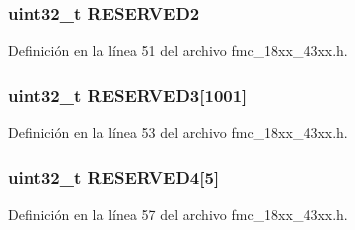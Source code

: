 \subsubsection[{\texorpdfstring{R\+E\+S\+E\+R\+V\+E\+D2}{RESERVED2}}]{ uint32\+\_\+t R\+E\+S\+E\+R\+V\+E\+D2}\hypertarget{struct_l_p_c___f_m_c___t_a13d8c36a296a876371d8e463cfce0bc5}{}\label{struct_l_p_c___f_m_c___t_a13d8c36a296a876371d8e463cfce0bc5}


Definición en la línea 51 del archivo fmc\+\_\+18xx\+\_\+43xx.\+h.

\subsubsection[{\texorpdfstring{R\+E\+S\+E\+R\+V\+E\+D3}{RESERVED3}}]{ uint32\+\_\+t R\+E\+S\+E\+R\+V\+E\+D3\mbox{[}1001\mbox{]}}\hypertarget{struct_l_p_c___f_m_c___t_a41e2c1a3d3b32a848a56fa4503784ee5}{}\label{struct_l_p_c___f_m_c___t_a41e2c1a3d3b32a848a56fa4503784ee5}


Definición en la línea 53 del archivo fmc\+\_\+18xx\+\_\+43xx.\+h.

\subsubsection[{\texorpdfstring{R\+E\+S\+E\+R\+V\+E\+D4}{RESERVED4}}]{ uint32\+\_\+t R\+E\+S\+E\+R\+V\+E\+D4\mbox{[}5\mbox{]}}\hypertarget{struct_l_p_c___f_m_c___t_a0525236eac2d6ad9d12d40697adada82}{}\label{struct_l_p_c___f_m_c___t_a0525236eac2d6ad9d12d40697adada82}


Definición en la línea 57 del archivo fmc\+\_\+18xx\+\_\+43xx.\+h.

